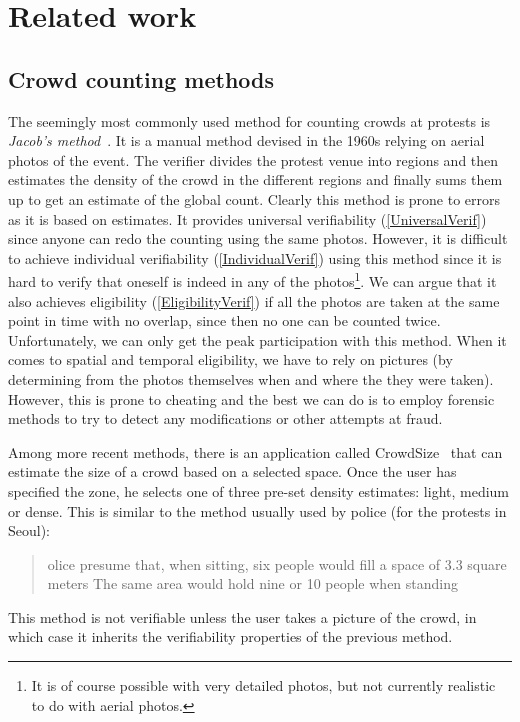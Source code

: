 \section{Related work}%
\label{RelatedWork}

\subsection{Crowd counting methods}

The seemingly most commonly used method for counting crowds at protests is \emph{Jacob's method}~\cite[c.f.][]{%
  2016DemonstrationsInSeoul,%
  BBCHowToCountProtestNumbers,%
  HowWillWeKnowTrumpInauguralCrowdSize,%
  TheXManMarch,%
  TheCrowdNumbersGame,%
}.
It is a manual method devised in the 1960s relying on aerial photos of the event.
The verifier divides the protest venue into regions and then estimates the density of the crowd in the different regions and finally sums them up to get an estimate of the global count.
Clearly this method is prone to errors as it is based on estimates.
It provides universal verifiability (\cref{UniversalVerif}) since anyone can redo the counting using the same photos.
However, it is difficult to achieve individual verifiability (\cref{IndividualVerif}) using this method since it is hard to verify that oneself is indeed in any of the photos\footnote{It is of course possible with very detailed photos, but not currently realistic to do with aerial photos.}.
We can argue that it also achieves eligibility (\cref{EligibilityVerif}) if all the photos are taken at the same point in time with no overlap, since then no one can be counted twice.
Unfortunately, we can only get the peak participation with this method.
When it comes to spatial and temporal eligibility, we have to rely on pictures (\eg by determining from the photos themselves when and where the they were taken).
However, this is prone to cheating and the best we can do is to employ forensic methods to try to detect any modifications or other attempts at fraud.

Among more recent methods, there is an application called CrowdSize~\cite{CrowdSize} that can estimate the size of a crowd 
based on a selected space.
Once the user has specified the zone, he selects one of three pre-set density estimates: light, medium or dense.
This is similar to the method usually used by police (\eg for the protests in Seoul):
\blockcquote{2016DemonstrationsInSeoul}{%
  olice presume that, when sitting, six people would 
  fill a space of 
  3.3 square meters
  \textelp{}
  The same area would hold nine or 10 people when standing%
}.
This method is not verifiable unless the user takes a picture of the crowd, in which case it inherits the verifiability properties of the previous method.

